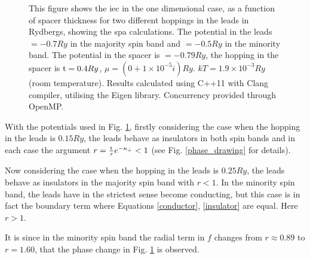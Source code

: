 \documentclass[a4paper, 12pt]{article}
\begin{document}
	\begin{figure}[H]
\caption{\footnotesize This figure shows the \gls{iec} in the one dimensional case, as a function of spacer thickness for two different hoppings in the leads in Rydbergs, showing the \gls{spa} calculations.
The potential in the leads $= -0.7Ry$ in the majority spin band and $=-0.5Ry$ in the minority band. The potential in the spacer is $= -0.79Ry$, the hopping in the spacer is ${\rm t} = 0.4Ry$, $\mu= (0 + 1\times 10^{-5}i)Ry$. $kT = 1.9\times 10^{-3}Ry$ (room temperature).  Results calculated using C++11 with Clang compiler, utilising the Eigen library. Concurrency provided through OpenMP.
}\label{phase_graph}
\end{figure}
With the potentials used in Fig. \ref{phase_graph}, firstly considering the case when the hopping in the leads is $0.15Ry$, the leads behave as insulators in both spin bands and in each case the argument $r=\frac{\rm t}{\tau}e^{-\kappa_\perp}<1$ (see Fig. \ref{phase_drawing} for details). 
\par Now considering the case when the hopping in the leads is $0.25Ry$, the leads behave as insulators in the majority spin band with $r<1$. In the minority spin band, the leads have in the strictest sense become conducting, but this case is in fact the boundary term where Equations \eqref{conductor}, \eqref{insulator} are equal. Here $r>1$.
\par It is since in the minority spin band the radial term in $f$ changes from $r\approx0.89$ to $r=1.60$, that the phase change in Fig. \ref{phase_graph} is observed.
\end{document}
